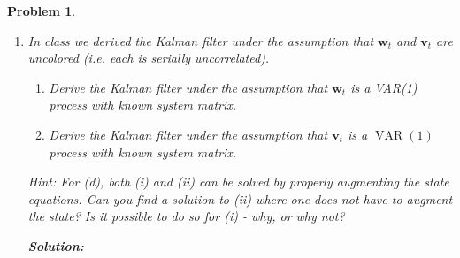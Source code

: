 \documentclass[11pt]{article}
\theoremstyle{plain} %
\newtheorem{problem}[theorem]{Problem}
\newenvironment{solution}
{\color{C2}\normalfont\begin{framed}\begingroup\textbf{Solution:} }
  {\endgroup\end{framed}}
\theoremstyle{remark}
\begin{document}
\begin{problem}
\begin{enumerate}[label=(\alph*)]
\begin{solution}
        \end{solution}
  \item In class we derived the Kalman filter under the assumption that
        $\mathbf{w}_t$ and $\mathbf{v}_t$ are uncolored (i.e. each is serially
        uncorrelated).
        \begin{enumerate}[label=(\roman*)]
          \item Derive the Kalman filter under the assumption that
                $\mathbf{w}_t$ is a VAR(1) process with known system matrix.
          \item Derive the Kalman filter under the assumption that
                $\mathbf{v}_t$ is a $\operatorname{VAR}(1)$ process with known
                system matrix.
        \end{enumerate}
        Hint: For (d), both (i) and (ii) can be solved by properly augmenting
        the state equations. Can you find a solution to (ii) where one does not
        have to augment the state? Is it possible to do so for (i) - why, or why
        not?

        \begin{solution}
          
        \end{solution}
\end{enumerate}

\end{problem}
\end{document}
